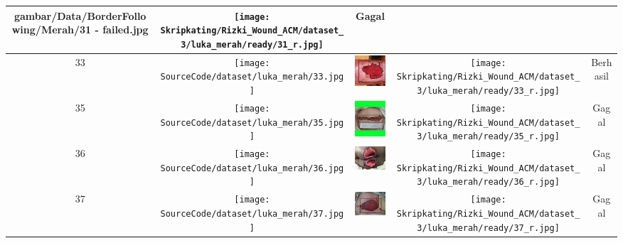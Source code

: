 \begin{longtable}[width = 8cm]{| c | c | c | c | c |}
        {gambar/Data/BorderFollowing/Merah/31 - failed.jpg} &
        \texttt{[image: Skripkating/Rizki\_Wound\_ACM/dataset\_3/luka\_merah/ready/31\_r.jpg]} &
        Gagal
        \\
        \hline
        33 &
        \texttt{[image: SourceCode/dataset/luka\_merah/33.jpg]} &
        \includegraphics[keepaspectratio, width=2cm]
        {gambar/Data/BorderFollowing/Merah/33 - sukses.jpg} &
        \texttt{[image: Skripkating/Rizki\_Wound\_ACM/dataset\_3/luka\_merah/ready/33\_r.jpg]} &
        Berhasil
        \\
        \hline
        35 &
        \texttt{[image: SourceCode/dataset/luka\_merah/35.jpg]} &
        \includegraphics[keepaspectratio, width=2cm]
        {gambar/Data/BorderFollowing/Merah/35 - failed.jpg} &
        \texttt{[image: Skripkating/Rizki\_Wound\_ACM/dataset\_3/luka\_merah/ready/35\_r.jpg]} &
        Gagal
        \\
        \hline
        36 &
        \texttt{[image: SourceCode/dataset/luka\_merah/36.jpg]} &
        \includegraphics[keepaspectratio, width=2cm]
        {gambar/Data/BorderFollowing/Merah/36 - failed.jpg} &
        \texttt{[image: Skripkating/Rizki\_Wound\_ACM/dataset\_3/luka\_merah/ready/36\_r.jpg]} &
        Gagal
        \\
        \hline
        37 &
        \texttt{[image: SourceCode/dataset/luka\_merah/37.jpg]} &
        \includegraphics[keepaspectratio, width=2cm]
        {gambar/Data/BorderFollowing/Merah/37 - failed.jpg} &
        \texttt{[image: Skripkating/Rizki\_Wound\_ACM/dataset\_3/luka\_merah/ready/37\_r.jpg]} &
        Gagal
        \\

\end{longtable}
